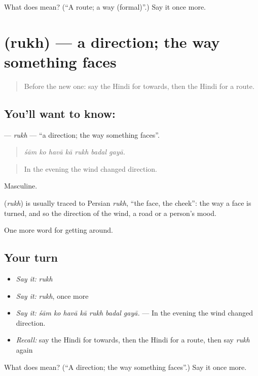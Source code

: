 \begin{tcolorbox}[breakable,colback=teal!4,colframe=teal!35!black,title={Before you move on}]
What does  mean? (\textquotedblleft{}A route; a way (formal)\textquotedblright{}.) Say it once more.
\end{tcolorbox}
\section[\texorpdfstring{\hi{रुख़} (rukh)}{रुख़ (rukh)}]{ (rukh) — a direction; the way something faces}

\label{lesson:HI-C417-rukh}



\begin{quote}
Before the new one: say the Hindi for towards, then the Hindi for a route.
\end{quote}

\subsection*{You'll want to know: }
\textbf{} — \emph{rukh} — \textquotedblleft{}a direction; the way something faces\textquotedblright{}.

\begin{quote}
      
\end{quote}

\begin{quote}
\emph{śām ko havā kā rukh badal gayā.}
\end{quote}

\begin{quote}
In the evening the wind changed direction.
\end{quote}

Masculine.

\begin{cousinweb}
\textbf{} (\emph{rukh}) is usually traced to Persian \emph{rukh}, \textquotedblleft{}the face, the cheek\textquotedblright{}: the way a face is turned, and so the direction of the wind, a road or a person's mood.
\end{cousinweb}

\begin{grammarlens}[title={What you've built}]
One more word for getting around.
\end{grammarlens}

\subsection*{Your turn}
\begin{itemize}
\raggedright
  \item \emph{Say it:} \emph{rukh}
  \item \emph{Say it:} \emph{rukh}, once more
  \item \emph{Say it:} \emph{śām ko havā kā rukh badal gayā.} — In the evening the wind changed direction.
  \item \emph{Recall:} say the Hindi for towards, then the Hindi for a route, then say \emph{rukh} again
\end{itemize}

\begin{tcolorbox}[breakable,colback=teal!4,colframe=teal!35!black,title={Before you move on}]
What does  mean? (\textquotedblleft{}A direction; the way something faces\textquotedblright{}.) Say it once more.
\end{tcolorbox}
